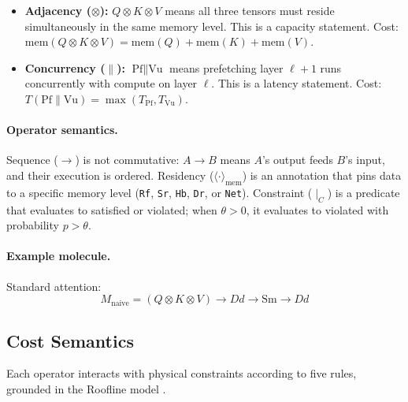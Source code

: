 \documentclass[10pt,twocolumn]{article}
\begin{document}
\begin{itemize}[nosep, leftmargin=*]
\item \textbf{Adjacency ($\otimes$):} $Q \otimes K \otimes V$ means all three tensors must reside simultaneously in the same memory level. This is a capacity statement. Cost: $\text{mem}(Q \otimes K \otimes V) = \text{mem}(Q) + \text{mem}(K) + \text{mem}(V)$.

\item \textbf{Concurrency ($\parallel$):} $\text{Pf} \parallel \text{Vu}$ means prefetching layer $\ell{+}1$ runs concurrently with compute on layer $\ell$. This is a latency statement. Cost: $T(\text{Pf} \parallel \text{Vu}) = \max(T_{\text{Pf}}, T_{\text{Vu}})$.
\end{itemize}

\paragraph{Operator semantics.} Sequence ($\rightarrow$) is not commutative: $A \rightarrow B$ means $A$'s output feeds $B$'s input, and their execution is ordered. Residency ($\langle \cdot \rangle_{\text{mem}}$) is an annotation that pins data to a specific memory level (\texttt{Rf}, \texttt{Sr}, \texttt{Hb}, \texttt{Dr}, or \texttt{Net}). Constraint ($\mid_C$) is a predicate that evaluates to satisfied or violated; when $\theta > 0$, it evaluates to violated with probability $p > \theta$.

\paragraph{Example molecule.} Standard attention:
\begin{equation}
\label{eq:naive}
M_{\text{naive}} = (Q \otimes K \otimes V) \rightarrow Dd \rightarrow \text{Sm} \rightarrow Dd
\end{equation}

\subsection{Cost Semantics}
\label{sec:cost-model}

Each operator interacts with physical constraints according to five rules, grounded in the Roofline model \citep{williams2009}.
\end{document}
